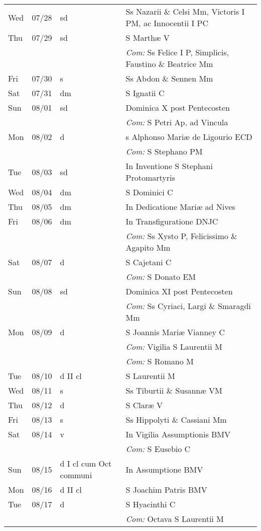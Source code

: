 \documentclass[10pt]{article}
\begin{document}
\begin{longtable}{ l l l l }
Wed & 07/28 & sd & Ss Nazarii \& Celsi Mm, Victoris I PM, ac Innocentii I PC\\
Thu & 07/29 & sd & S Marthæ V\\
 & & & \textit{Com:} Ss Felice I P, Simplicis, Faustino \& Beatrice Mm\\
Fri & 07/30 & s & Ss Abdon \& Sennen Mm\\
Sat & 07/31 & dm & S Ignatii C\\
Sun & 08/01 & sd & Dominica X post Pentecosten\\
 & & & \textit{Com:} S Petri Ap, ad Vincula\\
Mon & 08/02 & d & s Alphonso Mariæ de Ligourio ECD\\
 & & & \textit{Com:} S Stephano PM\\
Tue & 08/03 & sd & In Inventione S Stephani Protomartyris\\
Wed & 08/04 & dm & S Dominici C\\
Thu & 08/05 & dm & In Dedicatione Mariæ ad Nives\\
Fri & 08/06 & dm & In Transfiguratione DNJC\\
 & & & \textit{Com:} Ss Xysto P, Felicissimo \& Agapito Mm\\
Sat & 08/07 & d & S Cajetani C\\
 & & & \textit{Com:} S Donato EM\\
Sun & 08/08 & sd & Dominica XI post Pentecosten\\
 & & & \textit{Com:} Ss Cyriaci, Largi \& Smaragdi Mm\\
Mon & 08/09 & d & S Joannis Mariæ Vianney C\\
 & & & \textit{Com:} Vigilia S Laurentii M\\
 & & & \textit{Com:} S Romano M\\
Tue & 08/10 & d II cl & S Laurentii M\\
Wed & 08/11 & s & Ss Tiburtii \& Susannæ VM\\
Thu & 08/12 & d & S Claræ V\\
Fri & 08/13 & s & Ss Hippolyti \& Cassiani Mm\\
Sat & 08/14 & v & In Vigilia Assumptionis BMV\\
 & & & \textit{Com:} S Eusebio C\\
Sun & 08/15 & d I cl cum Oct communi & In Assumptione BMV\\
Mon & 08/16 & d II cl & S Joachim Patris BMV\\
Tue & 08/17 & d & S Hyacinthi C\\
 & & & \textit{Com:} Octava S Laurentii M\\

\end{longtable}
\end{document}
